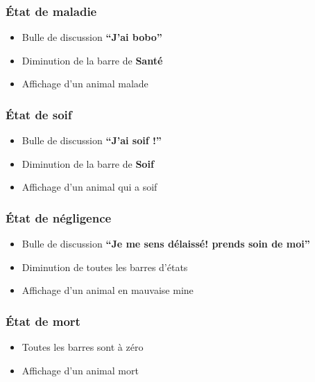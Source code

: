 \documentclass{conception_detaillee}
\begin{document}
\begin{itemize}[label=\textbullet]
\subsubsection{État de maladie}
\begin{itemize}
    \item Bulle de discussion \textbf{“J’ai bobo”}
    \item Diminution de la barre de \textbf{Santé}
    \item Affichage d’un animal malade
\end{itemize}

\subsubsection{État de soif}
\begin{itemize}
    \item Bulle de discussion \textbf{“J’ai soif !”}
    \item Diminution de la barre de \textbf{Soif}
    \item Affichage d’un animal qui a soif
\end{itemize}

\subsubsection{État de négligence}
\begin{itemize}
    \item Bulle de discussion \textbf{“Je me sens délaissé! prends soin de moi”}
    \item Diminution de toutes les barres d’états
    \item Affichage d’un animal en mauvaise mine
\end{itemize}

\subsubsection{État de mort}
\begin{itemize}
    \item Toutes les barres sont à zéro
    \item Affichage d’un animal mort
\end{itemize}

\end{itemize}
\end{document}
